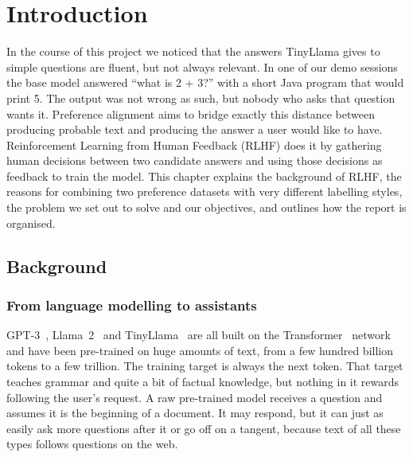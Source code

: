 \chapter{Introduction}
\label{ch:intro}

In the course of this project we noticed that the answers TinyLlama gives to simple questions are fluent, but not always relevant. In one of our demo sessions the base model answered ``what is 2 + 3?'' with a short Java program that would print 5. The output was not wrong as such, but nobody who asks that question wants it. Preference alignment aims to bridge exactly this distance between producing probable text and producing the answer a user would like to have. Reinforcement Learning from Human Feedback (RLHF) does it by gathering human decisions between two candidate answers and using those decisions as feedback to train the model. This chapter explains the background of RLHF, the reasons for combining two preference datasets with very different labelling styles, the problem we set out to solve and our objectives, and outlines how the report is organised.

\section{Background}
\label{sec:background}

\subsection{From language modelling to assistants}
GPT-3~\cite{brown2020gpt3}, Llama~2~\cite{touvron2023llama2} and TinyLlama~\cite{zhang2024tinyllama} are all built on the Transformer~\cite{vaswani2017attention} network and have been pre-trained on huge amounts of text, from a few hundred billion tokens to a few trillion. The training target is always the next token. That target teaches grammar and quite a bit of factual knowledge, but nothing in it rewards following the user's request. A raw pre-trained model receives a question and assumes it is the beginning of a document. It may respond, but it can just as easily ask more questions after it or go off on a tangent, because text of all these types follows questions on the web.

